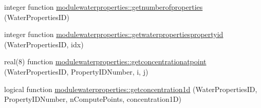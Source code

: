 \begin{DoxyCompactItemize}
\item 
integer function \mbox{\hyperlink{namespacemodulewaterproperties_a958863880a028313765dd3c1c2b598e2}{modulewaterproperties\+::getnumberofproperties}} (Water\+Properties\+ID)
\item 
integer function \mbox{\hyperlink{namespacemodulewaterproperties_ab28fc6f29d4d9d76db5238daf0715caf}{modulewaterproperties\+::getwaterpropertiespropertyid}} (Water\+Properties\+ID, idx)
\item 
real(8) function \mbox{\hyperlink{namespacemodulewaterproperties_ad43cb3a8e776adc92efab9346992a581}{modulewaterproperties\+::getconcentrationatpoint}} (Water\+Properties\+ID, Property\+I\+D\+Number, i, j)
\item 
logical function \mbox{\hyperlink{namespacemodulewaterproperties_a07e476dc922e05a1476e0df171c1bd25}{modulewaterproperties\+::getconcentration1d}} (Water\+Properties\+ID, Property\+I\+D\+Number, n\+Compute\+Points, concentration1D)
\end{DoxyCompactItemize}
